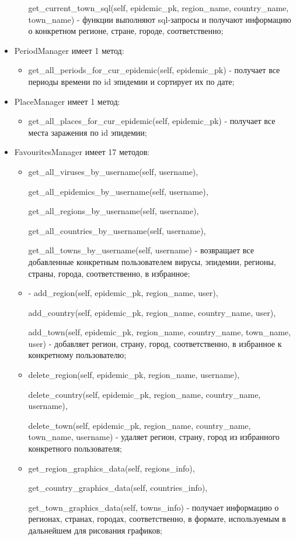 \documentclass[a4paper,14pt]{extarticle}
\begin{document}
\begin{itemize}
\begin{itemize}
 			  get\_current\_town\_sql(self, epidemic\_pk, region\_name, country\_name, town\_name) - функции выполняют sql-запросы и получают информацию о конкретном регионе, стране, городе, соответственно;
 		\end{itemize}
 		\item PeriodManager имеет 1 метод:
 		\begin{itemize}
 			\item get\_all\_periods\_for\_cur\_epidemic(self, epidemic\_pk) - получает все периоды времени по id эпидемии и сортирует их по дате;
 		\end{itemize}
 		\item PlaceManager имеет 1 метод:
 		\begin{itemize}
 			\item get\_all\_places\_for\_cur\_epidemic(self, epidemic\_pk) - получает все места заражения по id эпидемии;
 		\end{itemize}
 		\item FavouritesManager имеет 17 методов:
 		\begin{itemize}
 			\item get\_all\_viruses\_by\_username(self, username),
 			
 			 get\_all\_epidemics\_by\_username(self, username),
 			 
 			  get\_all\_regions\_by\_username(self, username),
 			  
 			   get\_all\_countries\_by\_username(self, username),
 			   
 			    get\_all\_towns\_by\_username(self, username)  - возвращает все добавленные конкретным пользователем вирусы, эпидемии, регионы, страны, города, соответственно, в избранное;
 			\item - add\_region(self, epidemic\_pk, region\_name, user), 
 			
 			add\_country(self, epidemic\_pk, region\_name, country\_name, user),
 			
 			 add\_town(self, epidemic\_pk, region\_name, country\_name, town\_name, user) - добавляет регион, страну, город, соответственно, в избранное к конкретному пользователю;
 			\item delete\_region(self, epidemic\_pk, region\_name, username),
 			
 			 delete\_country(self, epidemic\_pk, region\_name, country\_name, username),
 			 
 			  delete\_town(self, epidemic\_pk, region\_name, country\_name, town\_name, username) - удаляет регион, страну, город из избранного конкретного пользователя;
 			\item get\_region\_graphics\_data(self, regions\_info),
 			
 			 get\_country\_graphics\_data(self, countries\_info),
 			 
 			  get\_town\_graphics\_data(self, towns\_info) - получает информацию о регионах, странах, городах, соответственно, в формате, используемым в дальнейшем для рисования графиков;
 		\end{itemize}
 	\end{itemize}
 	
\end{document}
